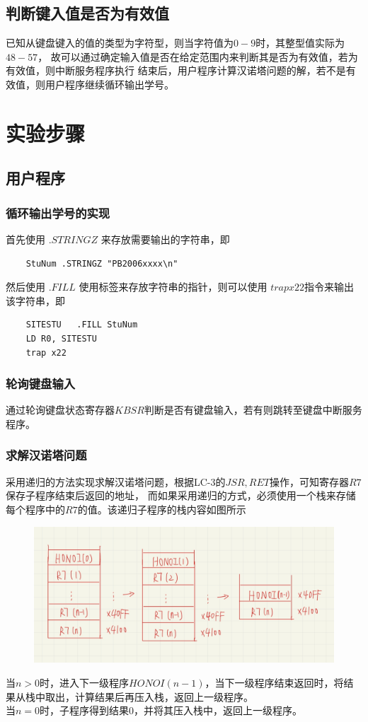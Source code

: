 \documentclass[12pt, a4paper, oneside]{ctexart}
\begin{document}
\subsection*{判断键入值是否为有效值}
已知从键盘键入的值的类型为字符型，则当字符值为$0-9$时，其整型值实际为$48-57$，
故可以通过确定输入值是否在给定范围内来判断其是否为有效值，若为有效值，则中断服务程序执行
结束后，用户程序计算汉诺塔问题的解，若不是有效值，则用户程序继续循环输出学号。

\section*{实验步骤}
\subsection*{用户程序}
\subsubsection*{循环输出学号的实现}
首先使用 $.STRINGZ$ 来存放需要输出的字符串，即
\begin{lstlisting}
    StuNum .STRINGZ "PB2006xxxx\n"
\end{lstlisting}
然后使用 $.FILL$ 使用标签来存放字符串的指针，则可以使用 $trap x22$指令来输出该字符串，即 
\begin{lstlisting}
    SITESTU   .FILL StuNum
    LD R0, SITESTU
    trap x22
\end{lstlisting}
\subsubsection*{轮询键盘输入}
通过轮询键盘状态寄存器$KBSR$判断是否有键盘输入，若有则跳转至键盘中断服务程序。
\subsubsection*{求解汉诺塔问题}
采用递归的方法实现求解汉诺塔问题，根据LC-3的$JSR,RET$操作，可知寄存器$R7$保存子程序结束后返回的地址，
而如果采用递归的方式，必须使用一个栈来存储每个程序中的$R7$的值。该递归子程序的栈内容如图所示
\begin{figure}[H]
    \centering
    \includegraphics[scale=0.28]{1.png}
\end{figure}
当$n>0$时，进入下一级程序$HONOI(n-1)$，当下一级程序结束返回时，将结果从栈中取出，计算结果后再压入栈，返回上一级程序。
\\当$n=0$时，子程序得到结果0，并将其压入栈中，返回上一级程序。
\end{document}
